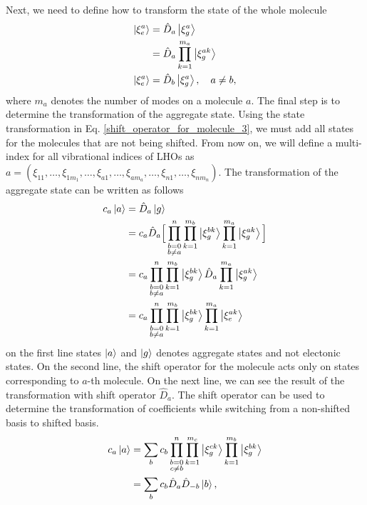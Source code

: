 Next, we need to define how to transform the state of the whole molecule
\begin{equation}
\label{shift_operator_for_molecule_3}
    \begin{aligned}
    \ket{\xi^{a}_e} &= \hat{D}_a \ket{\xi^{a}_g}\\
    &= \hat{D}_a \prod_{k=1}^{m_a} \ket{\xi^{ak}_g} \\
    \ket{\xi^{a}_e} &= \hat{D}_b \ket{\xi^{a}_g}, \quad a \neq b, \\
    \end{aligned}
\end{equation}
where $m_a$ denotes the number of modes on a molecule $a$. The final step is to determine the transformation of the aggregate state. Using the state transformation in Eq. \ref{shift_operator_for_molecule_3}, we must add all states for the molecules that are not being shifted. From now on, we will define a multi-index for all vibrational indices of LHOs as $a=(\xi_{11}, \ldots, \xi_{1m_1}, \ldots, \xi_{a1}, \ldots, \xi_{am_a}, \ldots, \xi_{n1}, \ldots, \xi_{nm_n})$. The transformation of the aggregate state can be written as follows
\begin{equation}
\label{shift_operator_for_molecule_4}
    \begin{aligned}
    c_{a} \ket{a} &= \hat{D}_a \ket{g}\\
    &= c_{a} \hat{D}_a \Big[ \prod_{\substack{b=0 \\ b\neq a}}^{n}\prod_{k=1}^{m_b} \ket{\xi^{bk}_g} \prod_{k=1}^{m_a} \ket{\xi^{ak}_g} \Big]\\
    &= c_{a} \prod_{\substack{b=0 \\ b\neq a}}^{n}\prod_{k=1}^{m_b} \ket{\xi^{bk}_g} \hat{D}_a \prod_{k=1}^{m_a} \ket{\xi^{ak}_g} \\
    &= c_{a} \prod_{\substack{b=0 \\ b\neq a}}^{n}\prod_{k=1}^{m_b} \ket{\xi^{bk}_g} \prod_{k=1}^{m_a} \ket{\xi^{ak}_e} 
    \end{aligned}
\end{equation}
on the first line states $\ket{a}$ and $\ket{g}$ denotes aggregate states and not electonic states. On the second line, the shift operator for the molecule acts only on states corresponding to $a$-th molecule. On the next line, we can see the result of the transformation with shift operator $\hat{D}_a$. The shift operator can be used to determine the transformation of coefficients while switching from a non-shifted basis to shifted basis.
\begin{equation}
\label{shift_operator_for_molecule_5}
    \begin{aligned}
    c_{a} \ket{a}
    &= \sum_{b} c_{b} \prod_{\substack{b=0 \\ c\neq b}}^{n}\prod_{k=1}^{m_c} \ket{\xi^{ck}_g} \prod_{k=1}^{m_b} \ket{\xi^{bk}_g} \\
     &= \sum_{b} c_{b} \hat{D}_a \hat{D}_{-b} \ket{b}, \\
    \end{aligned}
\end{equation}
